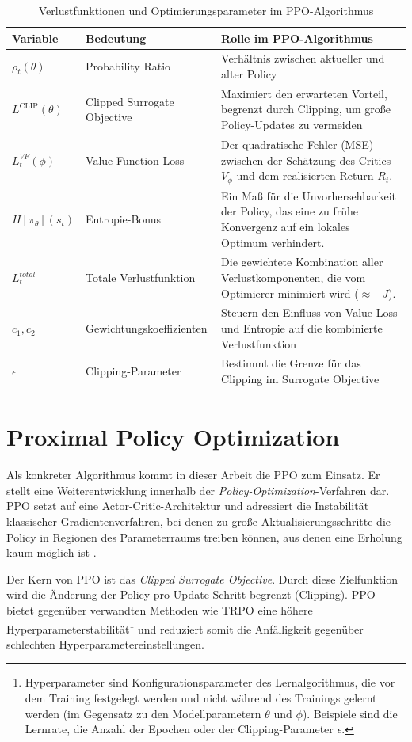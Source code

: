 \begin{table}[H]
\centering
\begin{tabular}{|p{2cm}|p{3cm}|p{7cm}|} 
\hline
\textbf{Variable} & \textbf{Bedeutung} & \textbf{Rolle im \ac{PPO}\hyp{}Algorithmus} \\
\hline
$\rho_t(\theta)$    & Probability Ratio & Verhältnis zwischen aktueller und alter Policy \\
$L^{\text{CLIP}}(\theta)$ & Clipped Surrogate Objective & Maxi\-miert den er\-warteten Vor\-teil, be\-grenzt durch Clipping, um große Policy\hyp{}Updates zu ver\-meiden \\
$L^{VF}_t(\phi)$  & Value Function Loss & Der qua\-dra\-tische Fehler (\ac{MSE}) zwischen der Schät\-zung des Critics $V_\phi$ und dem rea\-li\-sierten Return $R_t$. \\
$H[\pi_\theta](s_t)$ & Entropie\hyp{}Bonus & Ein Maß für die Unvorhersehbarkeit der Policy, das eine zu frühe Konvergenz auf ein lokales Optimum verhindert. \\
$L_t^{total}$     & Totale Verlustfunktion & Die ge\-wichtete Kom\-bi\-nation aller Verlust\-kom\-po\-nenten, die vom Opti\-mierer mini\-miert wird ($\approx -J$). \\
$c_1, c_2$        & Ge\-wich\-tungs\-ko\-ef\-fi\-zi\-en\-ten & Steuern den Ein\-fluss von Value Loss und Entropie auf die kom\-bi\-nierte Verlust\-funktion \\
$\epsilon$         & Clipping\hyp{}Parameter & Bestimmt die Grenze für das Clipping im Surrogate Objective \\
\hline
\end{tabular}
\caption{Verlustfunktionen und Optimierungsparameter im \ac{PPO}\hyp{}Algorithmus}
\label{tab:ppo_vars_part2}
\end{table}

\section{Proximal Policy Optimization}
Als konkreter Algorithmus kommt in dieser Arbeit die \ac{PPO} zum Einsatz. Er stellt eine Weiterentwicklung innerhalb der \textit{Policy\hyp{}Optimization}\hyp{}Verfahren dar.
\ac{PPO} setzt auf eine Actor\hyp{}Critic\hyp{}Architektur und adressiert die Instabilität klassischer Gradientenverfahren, bei denen zu große Aktualisierungsschritte die Policy in Regionen des Parameterraums treiben können, aus denen eine Erholung kaum möglich ist \cite{OriginalPPO}.
\medskip

Der Kern von \ac{PPO} ist das \textit{Clipped Surrogate Objective}. Durch diese Zielfunktion wird die Änderung der Policy pro Update\hyp{}Schritt begrenzt (Clipping).
\ac{PPO} bietet gegenüber verwandten Methoden wie \ac{TRPO} eine höhere Hyperparameterstabilität\footnote{Hyperparameter sind Konfigurationsparameter des Lernalgorithmus, die vor dem Training festgelegt werden und nicht während des Trainings gelernt werden (im Gegensatz zu den Modellparametern $\theta$ und $\phi$). Beispiele sind die Lernrate, die Anzahl der Epochen oder der Clipping\hyp{}Parameter $\epsilon$.} \cite[Abschn. 2.2]{OriginalPPO} und reduziert somit die Anfälligkeit gegenüber schlechten Hyperparametereinstellungen.
\medskip

